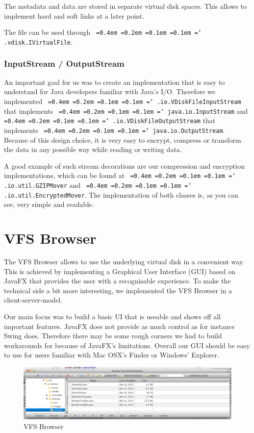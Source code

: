 \documentclass[a4paper,12pt]{article}
\newcommand*\justify{%
  \fontdimen2\font=0.4em%
  \fontdimen3\font=0.2em%
  \fontdimen4\font=0.1em%
  \fontdimen7\font=0.1em%
  \hyphenchar\font=`\-%
}
\newcommand{\mono}[1]{\texttt{\justify #1}}
\begin{document}
The metadata and data are stored in separate virtual disk spaces. This allows to implement hard and soft links at a later point.

The file can be used through \mono{.vdisk.IVirtualFile}.

\subsubsection{InputStream / OutputStream}
An important goal for us was to create an implementation that is easy to understand for Java developers familiar with Java's I/O. Therefore we implemented \mono{.io.VDiskFileInputStream} that implements \mono{java.io.InputStream} and \mono{.io.VDiskFileOutputStream} that implements \mono{java.io.OutputStream}. Because of this design choice, it is very easy to encrypt, compress or transform the data in any possible way while reading or writing data.

A good example of such stream decorations are our compression and encryption implementations, which can be found at \mono{.io.util.GZIPMover} and \mono{.io.util.EncryptedMover}. The implementation of both classes is, as you can see, very simple and readable.

\newpage



\section{VFS Browser}
The VFS Browser allows to use the underlying virtual disk in a convenient way. This is achieved by implementing a Graphical User Interface (GUI) based on JavaFX that provides the user with a recognisable experience. To make the technical side a bit more interesting, we implemented the VFS Browser in a client-server-model.

Our main focus was to build a basic UI that is useable and shows off all important features. JavaFX does not provide as much control as for instance Swing does. Therefore there may be some rough corners we had to build workarounds for because of JavaFX's limitations. Overall our GUI should be easy to use for users familiar with Mac OSX's Finder or Windows' Explorer.

\begin{figure}[h]
    \includegraphics[width=\textwidth]{screen1.png}
    \caption{VFS Browser}
\end{figure}
\end{document}
